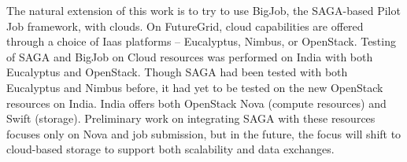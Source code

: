 \documentclass[]{paper}
\newcommand{\mrnote}[1]{ {\textcolor{cyan} { ***Melissa: #1 }}}
\newcommand{\mrnote}[1]{}
\begin{document}

The natural extension of this work is to try to use BigJob, the SAGA-based Pilot Job framework, with clouds.  On FutureGrid, cloud capabilities are offered through a choice of Iaas platforms -- Eucalyptus, Nimbus, or OpenStack. Testing of SAGA and BigJob on Cloud resources was performed on India with both Eucalyptus and OpenStack. Though SAGA had been tested with both Eucalyptus and Nimbus before, it had yet to be tested on the new OpenStack resources on India. India offers both OpenStack Nova (compute resources) and Swift (storage). Preliminary work on integrating SAGA with these resources focuses only on Nova and job submission, but in the future, the focus will shift to cloud-based storage to support both scalability and data exchanges.

\end{document}
